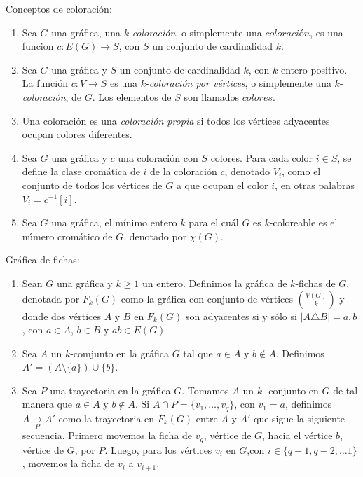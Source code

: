\begin{definicion} Conceptos de coloraci\'on:
    \label{def:coloracion}
    \begin{enumerate}
        \item Sea $G$ una gr\'afica, una $k$-\textit{coloraci\'on}, o
        simplemente una $\textit{coloraci\'on}$, es una funcion $c \colon
        E(G)\to S$, con $S$ un conjunto de cardinalidad $k$.
        \item Sea $G$ una gr\'afica y $S$ un conjunto de cardinalidad $k$, con
        $k$ entero positivo. La funci\'on $c: V \to S$ es una
        $k$-\textit{coloraci\'on por v\'ertices}, o simplemente una
        $k$-\textit{coloraci\'on}, de $G$. Los elementos de $S$ son llamados
        $\textit{colores}$.
        \item Una coloraci\'on es una \textit{coloraci\'on propia} si todos los
        v\'ertices adyacentes ocupan colores diferentes.
        \item Sea $G$ una gr\'afica y $c$ una coloraci\'on con $S$ colores. Para
        cada color $i \in S$, se define la clase crom\'atica de $i$ de la
        coloraci\'on $c$, denotado $V_i$, como el conjunto de todos los
        v\'ertices de $G$ a que ocupan el color $i$, en otras palabras $V_i =
        c^{-1}[i]$.
        \item  Sea $G$ una gr\'afica, el m\'inimo entero $k$ para el cu\'al $G$
        es $k$-coloreable es el n\'umero crom\'atico de $G$, denotado por
        $\chi(G)$.
    \end{enumerate}
\end{definicion}

\begin{definicion} Gr\'afica de fichas:
    \label{def:fichas}
    \begin{enumerate}
        \item Sean $G$ una gr\'afica y $k \geq 1$ un entero. Definimos la
        gr\'afica de $k$-fichas de $G$, denotada por $F_k(G)$ como la
        gr\'afica con conjunto de v\'ertices $\binom{V(G)}{k}$ y donde dos
        v\'ertices $A$ y $B$ en $F_k(G)$ son adyacentes si y s\'olo si $|A
        \triangle B| ={a,b}$, con $a \in A$, $b \in B$ y $ab \in E(G)$.
        \item Sea $A$ un $k$-comjunto en la gr\'afica $G$ tal que $a \in A$
        y $b\notin A$. Definimos $A'= (A \setminus \{a\}) \cup \{b\}$.
        \item Sea $P$ una trayectoria en la gr\'afica $G$. Tomamos $A$ un
        $k$- conjunto en $G$ de tal manera que $a\in A$ y $b \notin A$. Si
        $A\cap P =\{v_1, \dots, v_q\}$, con $v_1 = a$, definimos $A
        \xrightarrow[P]{} A'$ como la trayectoria en $F_k(G)$ entre $A$ y
        $A'$ que sigue la siguiente secuencia. Primero movemos la ficha de
        $v_q$, v\'ertice de $G$, hacia el v\'ertice $b$, v\'ertice de $G$,
        por $P$. Luego, para los v\'ertices $v_i$ en $G$,con $i \in \{q-1,
        q-2, \dots 1\}$, movemos la ficha de $v_i$ a $v_{i+1}$. 
    \end{enumerate}
\end{definicion}

